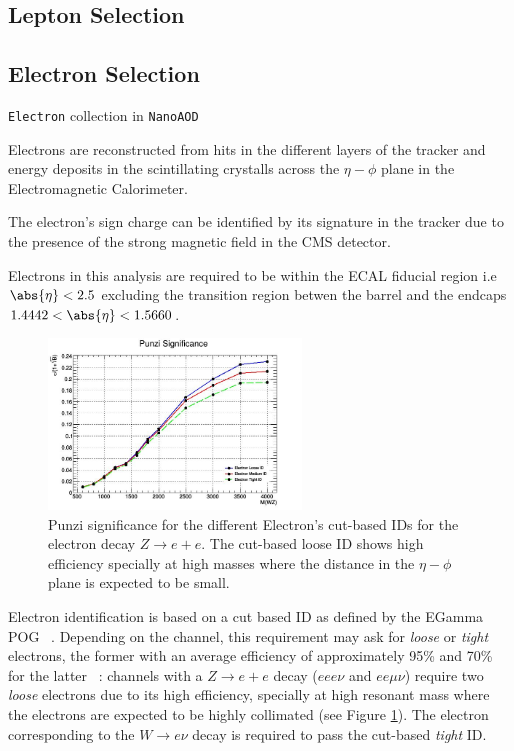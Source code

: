 \subsection{Lepton Selection}

\subsection{Electron Selection}

\verb|Electron| collection in \verb|NanoAOD|

Electrons are reconstructed from hits in the different
layers of the tracker and energy deposits in the scintillating crystalls
across the $\eta-\phi$ plane in the Electromagnetic Calorimeter.

The electron's sign charge can be identified by its signature in the tracker
due to the presence of the strong magnetic field in the CMS detector.

Electrons in this analysis are required to be within the ECAL fiducial
region i.e $\abs{\eta}<2.5$ excluding the transition region betwen the
barrel and the endcaps $1.4442<\abs{\eta}<1.5660$.

\begin{figure}[tph]
  \centering
  \includegraphics[width=0.6\textwidth]{fig/LeptonIDStudies/ElectronIDPunzi.png}
  \caption{Punzi significance for the different Electron's cut-based IDs for the
    electron decay $Z\rightarrow e+e$. The cut-based loose ID shows high efficiency
    specially at high masses where the distance in the $\eta-\phi$ plane is
    expected to be small.}
  \label{fig:PunziElectronIDs}
\end{figure}

Electron identification is based on a cut based ID as defined by the
EGamma POG ~\cite{EGammaPOG_el}. Depending on the channel, this requirement
may ask for \emph{loose} or \emph{tight} electrons, the former with an
average efficiency of approximately 95\% and 70\% for
the latter ~\cite{EGammaPOG_el}: channels with a $Z\rightarrow e+e$
decay ($eee\nu$ and $ee\mu\nu$) require two \emph{loose}
electrons due to its high efficiency, specially at high resonant mass where
the electrons are expected to be highly collimated (see Figure \ref{fig:PunziElectronIDs}).
The electron corresponding to the $W\rightarrow e\nu$ decay is required to pass
the cut-based \emph{tight} ID.

